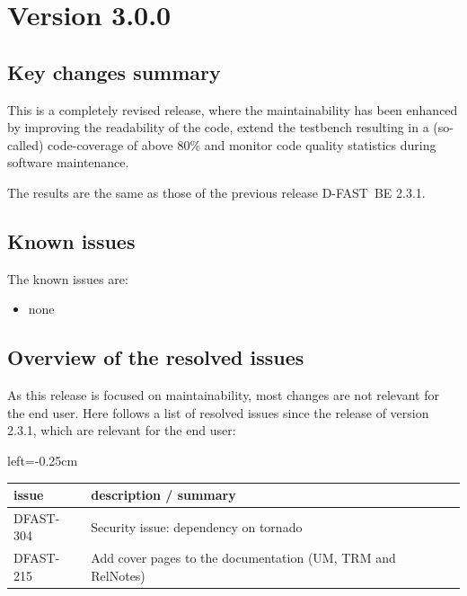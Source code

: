 \documentclass[git]{deltares_manual}
\newcommand{\dfbe}{\textrm{D-FAST~BE}\xspace}
\begin{document}
\section{Version 3.0.0}

\subsection{Key changes summary}
This is a completely revised release, where the maintainability has been enhanced by improving the readability of the code, extend the testbench resulting in a (so-called) code-coverage of above 80\% and monitor code quality statistics during software maintenance.

The results are the same as those of the previous release \dfbe 2.3.1.

\subsection{Known issues}

The known issues are:

\begin{itemize}
	\item none
\end{itemize}

\subsection{Overview of the resolved issues}

As this release is focused on maintainability, most changes are not relevant for the end user. Here follows a list of resolved issues since the release of version 2.3.1, which are relevant for the end user:

\begin{adjustbox}{left=-0.25cm}
	\begin{tabular}{ l l } 
		issue & description / summary\\ \hline
		DFAST-304 & Security issue: dependency on tornado \\
		DFAST-215 & Add cover pages to the documentation (UM, TRM and RelNotes) \\
	\end{tabular}
\end{adjustbox}

\pagestyle{empty}
\cleardoublepage
\mbox{}
\end{document}
